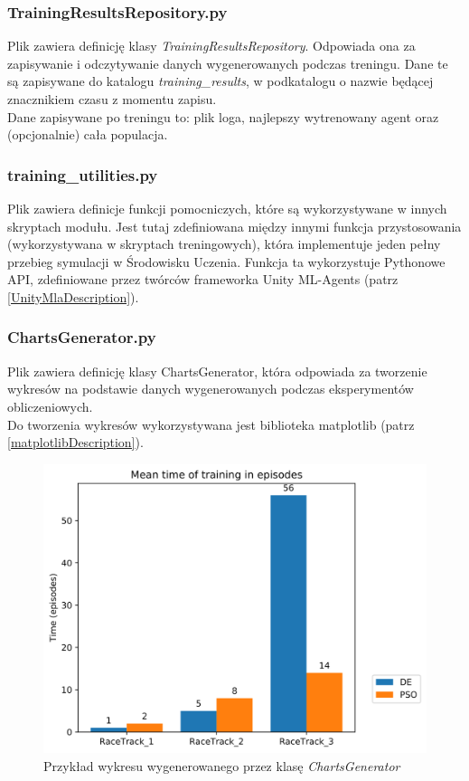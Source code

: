 \subsubsection{TrainingResultsRepository.py}
Plik zawiera definicję klasy \textit{TrainingResultsRepository}. Odpowiada ona za zapisywanie i odczytywanie danych wygenerowanych podczas treningu. Dane te są zapisywane do katalogu \textit{training\_results}, w podkatalogu o nazwie będącej znacznikiem czasu z momentu zapisu. \\
Dane zapisywane po treningu to: plik loga, najlepszy wytrenowany agent oraz (opcjonalnie) cała populacja.

\subsubsection{training\_utilities.py}
Plik zawiera definicje funkcji pomocniczych, które są wykorzystywane w innych skryptach modułu. Jest tutaj zdefiniowana między innymi funkcja przystosowania (wykorzystywana w skryptach treningowych), która implementuje jeden pełny przebieg symulacji w Środowisku Uczenia. Funkcja ta wykorzystuje Pythonowe API, zdefiniowane przez twórców frameworka Unity ML-Agents (patrz \ref{UnityMlaDescription}).

\subsubsection{ChartsGenerator.py}
Plik zawiera definicję klasy ChartsGenerator, która odpowiada za tworzenie wykresów na \hfill podstawie \hfill danych \hfill wygenerowanych \hfill podczas \hfill eksperymentów \hfill obliczeniowych. \\
Do tworzenia wykresów wykorzystywana jest biblioteka matplotlib (patrz \ref{matplotlibDescription}).

\vspace{0.5cm}
\begin{figure}[H]
\centering
\includegraphics[width=13cm]{resources/figures/train_time_episodes.png}
\caption{Przykład wykresu wygenerowanego przez klasę \textit{ChartsGenerator}}
\label{GeneratedChartExample}
\end{figure}

